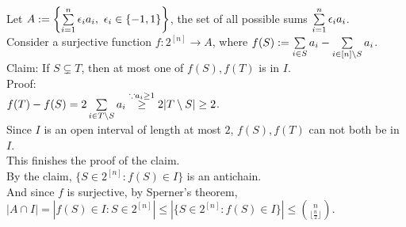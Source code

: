 \setcounter{pr}{3}

\begin{pr}
\newcommand{\e}{\mathbf{\epsilon}}
Let $A:=\left\{\suml_{i=1}^n\epsilon_ia_i,\ \epsilon_i\in\{-1, 1\}\right\}$, the set of all possible sums $\sum\limits_{i=1}^n\epsilon_ia_i$.\\
Consider a surjective function $f:2^{[n]}\to A$, where $f(S):=\sum\limits_{i\in S}a_i-\sum\limits_{i\in[n]\setminus S}a_i$.\\
Claim: If $S\subsetneq T$, then at most one of $f(S), f(T)$ is in $I$.\\
Proof:\\
$f(T)-f(S)=2\sum\limits_{i\in T\setminus S}a_i\overset{\because a_i\geq1}\geq2|T\setminus S|\geq2$.\\
Since $I$ is an open interval of length at most $2$, $f(S), f(T)$ can not both be in $I$.\\
This finishes the proof of the claim.\\
By the claim, $\{S\in2^{[n]}:f(S)\in I\}$ is an antichain.\\
And since $f$ is surjective, by Sperner's theorem, $|A\cap I|=|f(S)\in I:S\in2^{[n]}|\leq|\{S\in2^{[n]}:f(S)\in I\}|\leq\binom n{\lfloor\frac n2\rfloor}$.
\end{pr}
